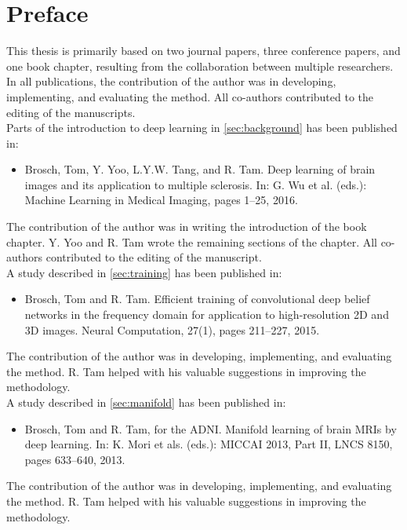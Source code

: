 \chapter*{Preface}

This thesis is primarily based on two journal papers, three conference
papers, and one book chapter, resulting from the collaboration between multiple
researchers. In all publications, the contribution of the author was in
developing, implementing, and evaluating the method. All co-authors
contributed to the editing of the manuscripts.
\\[1em]
Parts of the introduction to deep learning in \ref{sec:background} has been
published in:
\begin{itemize}
\item Brosch, Tom, Y. Yoo, L.Y.W. Tang, and R. Tam.
Deep learning of brain images and its application to multiple sclerosis.
In: G. Wu et al. (eds.): Machine Learning in Medical Imaging, pages 1--25,
2016.
\end{itemize}
The contribution of the author was in writing the introduction of the book
chapter. Y. Yoo and R. Tam wrote the remaining sections of the chapter. All
co-authors contributed to the editing of the manuscript.
\\[1em]
A study described in \ref{sec:training} has been published in:
\begin{itemize}
\item Brosch, Tom and R. Tam. Efficient training of convolutional deep
belief networks in the frequency domain for application to high-resolution 2D
and 3D images. Neural Computation, 27(1), pages 211--227, 2015.
\end{itemize}
The contribution of the author was in developing, implementing, and evaluating
the method. R. Tam helped with his valuable suggestions in improving the
methodology.
\\[1em]
A study described in \ref{sec:manifold} has been published in:
\begin{itemize}
\item Brosch, Tom and R. Tam, for the ADNI. Manifold learning of brain MRIs
by deep learning. In: K. Mori et als. (eds.): MICCAI 2013, Part II, LNCS 8150,
pages 633--640, 2013.
\end{itemize}
The contribution of the author was in developing, implementing, and evaluating
the method. R. Tam helped with his valuable suggestions in improving the
methodology.
\\[1em]
